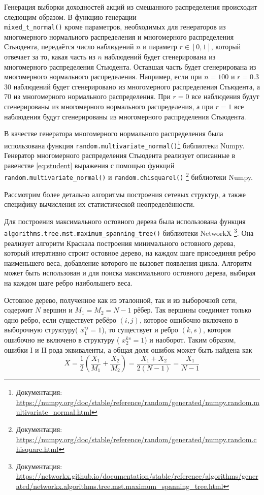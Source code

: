 Генерация выборки доходностей акций из смешанного распределения происходит следющим образом. В функцию генерации\\
\verb|mixed_t_normal()| кроме параметров, необходимых для генераторов из многомерного нормального распределения и многомерного распределения Стьюдента, передаётся число наблюдений $n$ и параметр $r \in [0,1]$, который отвечает за то, какая часть из $n$ наблюдений будет сгенерирована из многомерного распределения Стьюдента. Оставшая часть будет сгенерирована из многомерного нормального распределения. Например, если при $n=100$ и $r=0.3$ 30 наблюдений будет сгенерировано из многомерного распределения Стьюдента, а 70 из многомерного нормального распределения. При $r=0$ все наблюдения будут сгенерированы из многомерного нормального распределения, а при  $r=1$ все наблюдения будут сгенерированы из многомерного распределения Стьюдента. 

В качестве генератора многомерного нормального распределения  была использована функция \verb|random.multivariate_normal()|\footnote{Документация:  \url{https://numpy.org/doc/stable/reference/random/generated/numpy.random.multivariate_normal.html}} библиотеки Numpy. Генератор многомерного распределения Стьюдента реализует описанные в равенстве \ref{eq:student} выражения с помощью функций \verb|random.multivariate_normal()|  и  \verb|random.chisquarel()| \footnote{Документация:  \url{https://numpy.org/doc/stable/reference/random/generated/numpy.random.chisquare.html}} библиотеки Numpy.

Рассмотрим более детально алгоритмы построения сетевых структур, а также специфику вычисления их статистической неопределённости.

Для построения максимального остовного дерева была использована  функция \verb|algorithms.tree.mst.maximum_spanning_tree()| библиотеки NetworkX \footnote{Документация:  \url{https://networkx.github.io/documentation/stable/reference/algorithms/generated/networkx.algorithms.tree.mst.maximum_spanning_tree.html}}. Она реализует алгоритм Краскала\cite{kruskal} построения минимального остовного дерева, который итеративно строит остовное дерево, на каждом шаге присоединяя ребро наименьшего веса, добавление которого не вызовет появления цикла. Алгоритм может быть использован и для поиска максимального остовного дерева,  выбирая на каждом шаге ребро наибольшего веса.

Остовное дерево, полученное как из эталонной, так и из выборочной сети, содержит $N$ вершин и $M_1 = M_2 = N-1$ рёбер. Так вершины соединяет только одно ребро, если существует ребёро $(i,j)$, которое ошибочно включено в выборочную структуру( $x^{i j}_1=1$), то существует и ребро  $(k,s)$, котороя ошибочно не включено в структуру ( $x^{k s}_2=1$) и наоборот. Таким образом, ошибки I и II рода эквиваленты, а общая доля ошибок может быть найдена как
\begin{equation}
X = \frac{1}{2}\left(\frac{X_1}{M_1} + \frac{X_2}{M_2}\right) = \frac{X_1 + X_2}{2(N-1)} = \frac{X_1}{N-1}
\end{equation}

